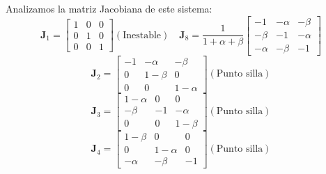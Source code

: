 \documentclass[twocolumn,aps,prl]{revtex4-1}
\newcommand{\talf}{\frac{\alpha - 1}{\alpha \beta - 1} }
\newcommand{\tbet}{\frac{\beta  - 1}{\alpha \beta - 1} }
\begin{document}
Analizamos la matriz Jacobiana de este sistema:
$$
\mathbf{J}_1 = 
\begin{bmatrix}
    1  & 0 & 0 \\
    0 & 1 & 0 \\
    0 & 0 & 1
\end{bmatrix} (\text{Inestable})
\quad 
\mathbf{J}_8 = 
\frac{1}{1+\alpha+\beta}\begin{bmatrix}
    -1 & -\alpha & -\beta \\
    -\beta & -1 & -\alpha \\
    -\alpha & -\beta & -1
\end{bmatrix}
$$
$$
\mathbf{J}_2 = 
\begin{bmatrix}
    -1 & - \alpha & - \beta \\
    0 & 1-\beta & 0 \\
    0 & 0 & 1- \alpha
\end{bmatrix} (\text{Punto silla})
$$
$$
\mathbf{J}_3 = 
\begin{bmatrix}
    1 - \alpha  & 0 & 0 \\
    - \beta & -1 & - \alpha \\
    0 & 0 & 1  - \beta
\end{bmatrix} (\text{Punto silla})
$$
$$
\mathbf{J}_4 = 
\begin{bmatrix}
    1 - \beta  & 0 & 0 \\
    0 & 1 -\alpha  & 0 \\
    - \alpha  & -\beta & -1
\end{bmatrix} (\text{Punto silla})
$$
\end{document}
